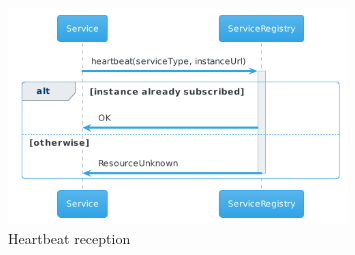 \begin{itemize}
\begin{figure}[H]
        \centering
        \includegraphics[width=0.8\textwidth]{Diagrams/sequence/service_heartbeat.png}
        \caption{Heartbeat reception}
    \end{figure}
\end{itemize}

